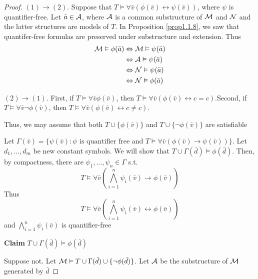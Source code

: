 \documentclass[11pt]{article}
\begin{document}
\begin{proof}
\((1)\to(2)\). Suppose that \(T\vDash\forall\bar{v}(\phi(\bar{v})\leftrightarrow\psi(\bar{v}))\),
where \(\psi\) is quantifier-free. Let \(\bar{a}\in\mathcal{A}\), where \(\mathcal{A}\) is a
common substructure of \(\mathcal{M}\) and \(\mathcal{N}\) and the latter structures are
models of \(T\). In Proposition \ref{prop1.1.8}, we saw that quantifer-free
formulas are preserved under substructure and extension. Thus
\begin{align*}
\mathcal{M}\vDash\phi(\bar{a})&\Leftrightarrow\mathcal{M}\vDash\psi(\bar{a})\\
&\Leftrightarrow\mathcal{A}\vDash\psi(\bar{a})\\
&\Leftrightarrow\mathcal{N}\vDash\psi(\bar{a})\\
&\Leftrightarrow\mathcal{N}\vDash\phi(\bar{a})
\end{align*}

\((2)\to(1)\). First, if \(T\vDash\forall\bar{v}\phi(\bar{v})\), then
\(T\vDash\forall\bar{v}(\phi(\bar{v})\leftrightarrow c=c)\).Second, if
\(T\vDash\forall\bar{v}\neg\phi(\bar{v})\), then
\(T\vDash\forall\bar{v}(\phi(\bar{v})\leftrightarrow c\neq c)\).

Thus, we may assume that both \(T\cup\{\phi(\bar{v})\}\) and \(T\cup\{\neg\phi(\bar{v})\}\)
are satisfiable

Let  \(\Gamma(\bar{v})=\{\psi(\bar{v}):\psi\text{ is quantifier free and }T\vDash\forall\bar{v}(\phi(\bar{v})\to\psi(\bar{v}))\}\).
Let \(d_1,\dots,d_m\) be new constant symbols. We will show that \(T\cup\Gamma(\bar{d})\vDash\phi(\bar{d})\). Then, by
compactness, there are  \(\psi_1,\dots,\psi_n\in\Gamma\) s.t. \label{Problem2}
\begin{equation*}
T\vDash\forall\bar{v}\left(\displaystyle\bigwedge_{i=1}^n\psi_i(\bar{v})\to\phi(\bar{v})
\right)
\end{equation*}
Thus
\begin{equation*}
T\vDash\forall\bar{v}\left(\displaystyle\bigwedge_{i=1}^n\psi_i(\bar{v})\leftrightarrow
\phi(\bar{v})
\right)
\end{equation*}
and \(\displaystyle\bigwedge_{i=1}^n\psi_i(\bar{v})\) is quantifier-free

\textbf{Claim} \(T\cup\Gamma(\bar{d})\vDash\phi(\bar{d})\)

Suppose not. Let \(\mathcal{M}\vDash T\cup\Gamma(\bar{d})\cup\{\neg\phi(\bar{d})\}\). Let \(\mathcal{A}\)
be the substructure of \(\mathcal{M}\) generated by \(\bar{d}\)


\end{proof}
\end{document}
